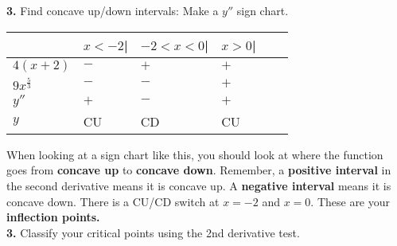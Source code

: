 \documentclass[12pt,fleqn]{book} %
\begin{document}
\pagebreak

\noindent \textbf{3.} Find concave up/down intervals: Make a $y''$ sign chart.

\begin{center}
    \begin{table}[h]
        \centering
        \begin{tabular}{l l l l l l}
            \toprule
            \textbf{}        & \textbf{$x<-2$\hspace{3mm}|} & \textbf{$-2<x<0$\hspace{5mm}|} & \textbf{$x>0$\hspace{5mm}|} \\
            \midrule
            $4(x+2)$         & \hspace{5mm}$-$              & \hspace{10mm}$+$               & \hspace{5mm}$+$             \\
            $9x^\frac{5}{3}$ & \hspace{5mm}$-$              & \hspace{10mm}$-$               & \hspace{5mm}$+$             \\
            $y''$            & \hspace{5mm}$+$              & \hspace{10mm}$-$               & \hspace{5mm}$+$             \\
            $y$              & \hspace{5mm}CU               & \hspace{10mm}CD                & \hspace{5mm}CU              \\
            \bottomrule
        \end{tabular}
    \end{table}
\end{center}

\noindent When looking at a sign chart like this, you should look at where the function goes from \textbf{concave up} to \textbf{concave down}. Remember,
a \textbf{positive interval} in the second derivative means it is concave up. A \textbf{negative interval} means it is concave down. There is a CU/CD switch at
$x=-2$ and $x=0$. These are your \textbf{inflection points.} \\

\noindent \textbf{3.} Classify your critical points using the 2nd derivative test.
\end{document}
